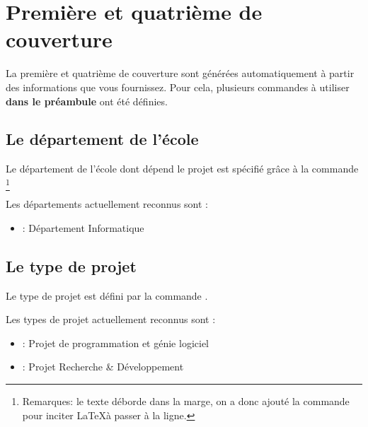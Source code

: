\documentclass[overfullbox,hideweeklyreports,noseparatecontributorspage,nodate]{polytech/polytech}
\begin{document}
\chapter{Première et quatrième de couverture}

\label{chap:premierequatrieme}

La première et quatrième de couverture sont générées automatiquement à partir des informations que vous fournissez. Pour cela, plusieurs commandes à utiliser \textbf{dans le préambule} ont été définies.

\section{Le département de l'école}

Le département de l'école dont dépend le projet est spécifié grâce à la commande \linebreak{}\footnote{Remarques: le texte déborde dans la marge, on a donc ajouté la commande \latexcode{\\linebreak} pour inciter \LaTeX à passer à la ligne.}

\begin{latexsource}
\end{latexsource}

Les départements actuellement reconnus sont :
\begin{itemize}
  \item {} : Département Informatique
\end{itemize}

\section{Le type de projet}

Le type de projet est défini par la commande .
\begin{latexsource}
\end{latexsource}

Les types de projet actuellement reconnus sont :
\begin{itemize}
  \item {} : Projet de programmation et génie logiciel
  \item {} : Projet Recherche \& Développement
\end{itemize}
\end{document}

